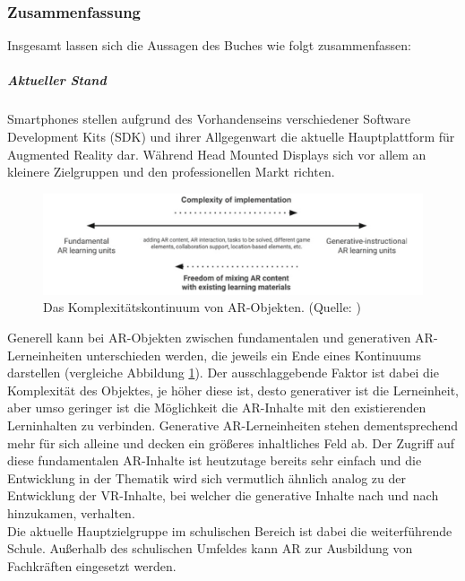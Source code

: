 \subsubsection{Zusammenfassung}
Insgesamt lassen sich die Aussagen des Buches wie folgt zusammenfassen:
\subparagraph{Aktueller Stand}
Smartphones stellen aufgrund des Vorhandenseins verschiedener Software Development Kits (SDK) und ihrer Allgegenwart die aktuelle Hauptplattform für Augmented Reality dar. Während Head Mounted Displays sich vor allem an kleinere Zielgruppen und den professionellen Markt richten. \citep[Kapitel 1.2]{geroimenko:ar-in-education}\\
\begin{figure}
\centering
\includegraphics[width=1.0\textwidth]{Abbildungen/ar-object-continuum.png}
\caption[Geroimenko: Komplexitätskontinuum von AR-Objekten]{Das Komplexitätskontinuum von AR-Objekten. (Quelle: \cite[S. 9]{geroimenko:ar-in-education})}
\label{fig:komplexitätskontinuum}
\end{figure}
Generell kann bei AR-Objekten zwischen fundamentalen und generativen AR-Lerneinheiten unterschieden werden, die jeweils ein Ende eines Kontinuums darstellen (vergleiche Abbildung \ref{fig:komplexitätskontinuum}).
Der ausschlaggebende Faktor ist dabei die Komplexität des Objektes, je höher diese ist, desto generativer ist die Lerneinheit, aber umso geringer ist die Möglichkeit die AR-Inhalte mit den existierenden Lerninhalten zu verbinden. 
Generative AR-Lerneinheiten stehen dementsprechend mehr für sich alleine und decken ein größeres inhaltliches Feld ab.
Der Zugriff auf diese fundamentalen AR-Inhalte ist heutzutage bereits sehr einfach und die Entwicklung in der Thematik wird sich vermutlich ähnlich analog zu der Entwicklung der VR-Inhalte, bei welcher die generative Inhalte nach und nach hinzukamen, verhalten.\citep[Kapitel 1.3]{geroimenko:ar-in-education}\\
Die aktuelle Hauptzielgruppe im schulischen Bereich ist dabei die weiterführende Schule. Außerhalb des schulischen Umfeldes kann AR zur Ausbildung von Fachkräften eingesetzt werden. \citep[Kapitel 1.5]{geroimenko:ar-in-education}

